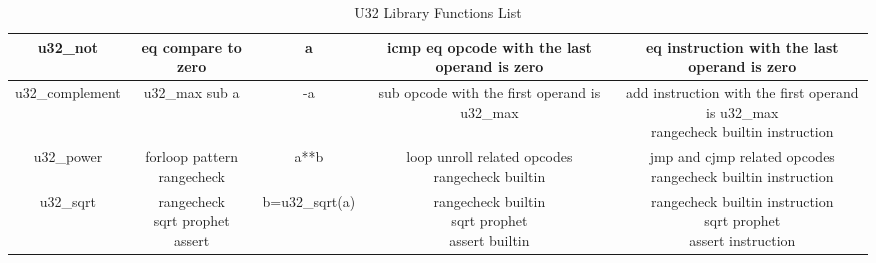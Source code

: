\begin{table}[!htp]
{\begin{tabular}{|c|c|c|c|c|}
                u32\_not  & eq compare to zero & \!a & icmp eq opcode with the last operand is zero & eq instruction with the last operand is zero \\ \hline
                u32\_complement  & u32\_max sub a & -a & sub opcode with the first operand is u32\_max & \makecell{add instruction with the first operand is u32\_max \\ rangecheck builtin instruction}  \\ \hline
                u32\_power  & \makecell{forloop pattern \\ rangecheck} & a**b & \makecell{loop unroll related opcodes \\ rangecheck builtin} & \makecell{jmp and cjmp related opcodes \\ rangecheck builtin instruction} \\ \hline
                u32\_sqrt  & \makecell{rangecheck \\ sqrt prophet \\ assert} & b=u32\_sqrt(a) & \makecell{rangecheck builtin \\ sqrt prophet \\ assert builtin} & \makecell{rangecheck builtin instruction\\ sqrt prophet \\ assert instruction} \\ \hline
            \end{tabular}}
        \caption{U32 Library Functions List}
        \label{table:u32-libFunctions-list}
    \end{table}